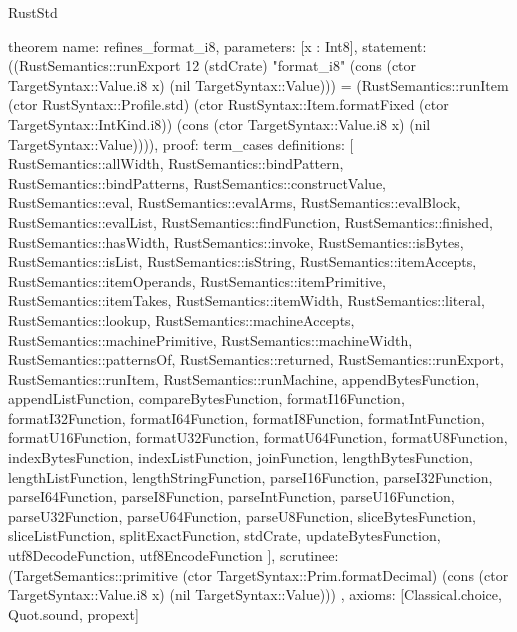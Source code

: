 \begin{lexlean}{RustStd}
\begin{semanticmodule}
theorem{
  name: refines_format_i8,
  parameters: [x : Int8],
  statement: ((RustSemantics::runExport 12 (stdCrate) "format_i8" (cons (ctor TargetSyntax::Value.i8 x) (nil TargetSyntax::Value))) = (RustSemantics::runItem (ctor RustSyntax::Profile.std) (ctor RustSyntax::Item.formatFixed (ctor TargetSyntax::IntKind.i8)) (cons (ctor TargetSyntax::Value.i8 x) (nil TargetSyntax::Value)))),
  proof: term_cases{
    definitions: [
      RustSemantics::allWidth,
      RustSemantics::bindPattern,
      RustSemantics::bindPatterns,
      RustSemantics::constructValue,
      RustSemantics::eval,
      RustSemantics::evalArms,
      RustSemantics::evalBlock,
      RustSemantics::evalList,
      RustSemantics::findFunction,
      RustSemantics::finished,
      RustSemantics::hasWidth,
      RustSemantics::invoke,
      RustSemantics::isBytes,
      RustSemantics::isList,
      RustSemantics::isString,
      RustSemantics::itemAccepts,
      RustSemantics::itemOperands,
      RustSemantics::itemPrimitive,
      RustSemantics::itemTakes,
      RustSemantics::itemWidth,
      RustSemantics::literal,
      RustSemantics::lookup,
      RustSemantics::machineAccepts,
      RustSemantics::machinePrimitive,
      RustSemantics::machineWidth,
      RustSemantics::patternsOf,
      RustSemantics::returned,
      RustSemantics::runExport,
      RustSemantics::runItem,
      RustSemantics::runMachine,
      appendBytesFunction,
      appendListFunction,
      compareBytesFunction,
      formatI16Function,
      formatI32Function,
      formatI64Function,
      formatI8Function,
      formatIntFunction,
      formatU16Function,
      formatU32Function,
      formatU64Function,
      formatU8Function,
      indexBytesFunction,
      indexListFunction,
      joinFunction,
      lengthBytesFunction,
      lengthListFunction,
      lengthStringFunction,
      parseI16Function,
      parseI32Function,
      parseI64Function,
      parseI8Function,
      parseIntFunction,
      parseU16Function,
      parseU32Function,
      parseU64Function,
      parseU8Function,
      sliceBytesFunction,
      sliceListFunction,
      splitExactFunction,
      stdCrate,
      updateBytesFunction,
      utf8DecodeFunction,
      utf8EncodeFunction
    ],
    scrutinee: (TargetSemantics::primitive (ctor TargetSyntax::Prim.formatDecimal) (cons (ctor TargetSyntax::Value.i8 x) (nil TargetSyntax::Value)))
  },
  axioms: [Classical.choice, Quot.sound, propext]
}


\end{semanticmodule}
\end{lexlean}
